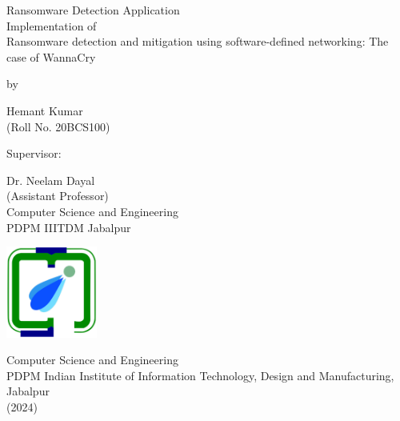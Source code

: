 \documentclass[12pt,twocolumn]{article}
\begin{document}
\begin{titlepage}
    \begin{center}
        \vspace*{1cm}
        
        {\LARGE Ransomware Detection Application} \\
        \Large{Implementation of \\ {Ransomware detection and mitigation using software-defined networking: The case of WannaCry}}
        
        \vspace{0.6cm}
        
        \Large by
        
        {\Large Hemant Kumar} \\
        (Roll No. 20BCS100)
        
        \vspace{1cm}
        
        \Large Supervisor:
        
        {\Large Dr. Neelam Dayal }\\
            (Assistant Professor) \\
        Computer Science and Engineering \\
        PDPM IIITDM Jabalpur
        
        \vspace{1cm}
        
        
        
        \vfill
        
        \includegraphics[width=30mm]{logo_college copy.png}
        
        \vspace{0.5cm}
        
        \Large{Computer Science and Engineering 
        \\ PDPM Indian Institute of Information Technology, Design and Manufacturing, Jabalpur}
        \\ (2024)
        
    \end{center}
\end{titlepage}
\end{document}
